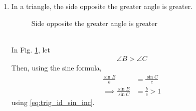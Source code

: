 \begin{enumerate}[label=\arabic*.,ref=\thesubsection.\theenumi]
%
\item In a triangle, the side opposite the greater angle is greater.
\begin{figure}[!ht]
	\begin{center}
			\resizebox{\columnwidth}{!}{}
	\end{center}
	\caption{Side opposite the greater angle is greater}
	\label{fig:tri_ang_side}	
\end{figure}
\\
\solution In Fig. 	\ref{fig:tri_ang_side},	let
%
\begin{align}
\angle B > \angle C
\end{align}
%
Then, using the sine formula,
%
\begin{align}
\frac{\sin B}{b} &=\frac{\sin C}{c}
\\
\implies   \frac{\sin B}{\sin C} &= \frac{b}{c} > 1
\end{align}
using \eqref{eq:trig_id_sin_inc}.


\end{enumerate}

